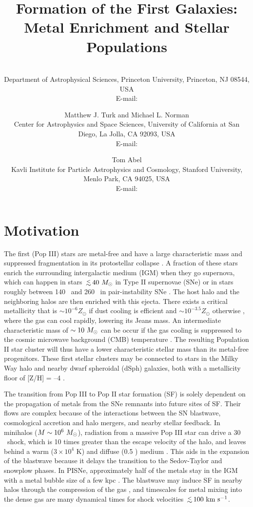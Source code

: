 \documentclass{PoS}
\title{Formation of the First Galaxies: Metal Enrichment and Stellar
  Populations}
\author{\speaker{John H. Wise}\\
        Department of Astrophysical Sciences, Princeton University,
        Princeton, NJ 08544, USA\\
        E-mail: \email{jwise@astro.princeton.edu}}
\author{Matthew J. Turk and Michael L. Norman\\
        Center for Astrophysics and Space Sciences,
        University of California at San Diego, La Jolla, CA 92093, USA\\
        E-mail: \email{matthewturk@gmail.com}}
\author{Tom Abel\\
        Kavli Institute for Particle Astrophysics and
        Cosmology, Stanford University, Menlo Park, CA 94025, USA\\
        E-mail: \email{tabel@stanford.edu}}
\begin{document}
\section{Motivation}

The first (Pop III) stars are metal-free and have a large
characteristic mass and suppressed fragmentation in its protostellar
collapse \citep{ABN02, Bromm02_P3, OShea07a}.  A fraction of these
stars enrich the surrounding intergalactic medium (IGM) when they go
supernova, which can happen in stars $\lsim 40~\Ms$ in Type II
supernovae (SNe) or in stars roughly between 140 \Ms~and 260 \Ms~in
pair-instability SNe \citep[PISNe;][]{2002ApJ...567..532H}.  The host
halo and the neighboring halos are then enriched with this ejecta.
There exists a critical metallicity that is $\sim 10^{-6} Z_\odot$ if
dust cooling is efficient \citep{Omukai05, Schneider06_Frag, clark08}
and $\sim 10^{-3.5} Z_\odot$ otherwise \citep{Bromm01,
  2009ApJ...691..441S}, where the gas can cool rapidly, lowering its
Jeans mass.  An intermediate characteristic mass of $\sim10~\Ms$ can
be occur if the gas cooling is suppressed to the cosmic microwave
background (CMB) temperature \citep{Larson98, Tumlinson07_IMF,
  2009ApJ...691..441S}.  The resulting Population II star cluster will
thus have a lower characteristic stellar mass than its metal-free
progenitors.  These first stellar clusters may be connected to stars
in the Milky Way halo and nearby dwarf spheroidal (dSph) galaxies,
both with a metallicity floor of [Z/H] = --4 \citep{Beers05,
  Tafelmeyer10, Frebel10_Obs}.

The transition from Pop III to Pop II star formation (SF) is solely
dependent on the propagation of metals from the SNe remnants into
future sites of SF.  Their flows are complex because of the
interactions between the SN blastwave, cosmological accretion and halo
mergers, and nearby stellar feedback.  In minihalos ($M \sim
10^6~\Ms$), radiation from a massive Pop III star can drive a 30
\kms~shock, which is 10 times greater than the escape velocity of the
halo, and leaves behind a warm ($3 \times 10^4$ K) and diffuse (0.5
\cubecm) medium \citep{Kitayama04, Whalen04, Abel07}.  This aids in the
expansion of the blastwave because it delays the transition to the
Sedov-Taylor and snowplow phases.  In PISNe, approximately half of the
metals stay in the IGM with a metal bubble size of a few kpc
\citep{Wise08_Gal, Greif10}.  The blastwave may induce SF in nearby
halos through the compression of the gas \citep{Ferrara98}, and
timescales for metal mixing into the dense gas are many dynamical
times \citep{Cen08} for shock velocities $\lsim100~\kms$.
\end{document}
